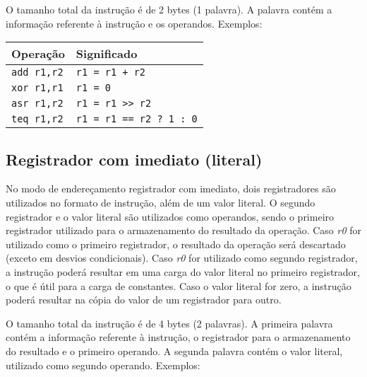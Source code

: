 \documentclass[11pt,a4paper]{report}
\begin{document}
O tamanho total da instrução é de 2 bytes (1 palavra). A palavra contém
a informação referente à instrução e os operandos. Exemplos:

\begin{table}[htb!]
\centering
\begin{tabular}{|p{5.0cm}|p{8.0cm}|}
\hline
\bf{Operação} & \bf{Significado} \\ \hline \hline
\texttt{add r1,r2} & \verb|r1 = r1 + r2| \\ \hline
\texttt{xor r1,r1} & \verb|r1 = 0| \\ \hline
\texttt{asr r1,r2} & \verb|r1 = r1 >> r2| \\ \hline
\texttt{teq r1,r2} & \verb|r1 = r1 == r2 ? 1 : 0| \\ \hline
\end{tabular}
\end{table}

\subsection{Registrador com imediato (literal)}

No modo de endereçamento registrador com imediato, dois registradores
são utilizados no formato de instrução, além de um valor literal. O
segundo registrador e o valor literal são utilizados como operandos, 
sendo o primeiro registrador utilizado para o armazenamento do resultado
da operação. Caso \textit{r0} for utilizado como o primeiro registrador,
o resultado da operação será descartado (exceto em desvios condicionais).
Caso \textit{r0} for utilizado como segundo registrador, a instrução
poderá resultar em uma carga do valor literal no primeiro registrador,
o que é útil para a carga de constantes. Caso o valor literal for zero,
a instrução poderá resultar na cópia do valor de um registrador para 
outro.

O tamanho total da instrução é de 4 bytes (2 palavras). A primeira 
palavra contém a informação referente à instrução, o registrador para
o armazenamento do resultado e o primeiro operando. A segunda palavra
contém o valor literal, utilizado como segundo operando. Exemplos:
\end{document}
